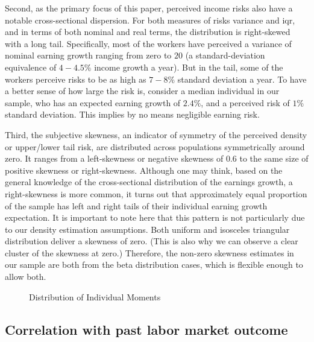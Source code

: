 \documentclass[12pt,notitlepage,onecolumn,aps,pra]{article}
\begin{document}
Second, as the primary focus of this paper, perceived income risks also
have a notable cross-sectional dispersion. For both measures of risks
variance and iqr, and in terms of both nominal and real terms, the
distribution is right-skewed with a long tail. Specifically, most of the
workers have perceived a variance of nominal earning growth ranging from
zero to \(20\) (a standard-deviation equivalence of \(4-4.5\%\) income
growth a year). But in the tail, some of the workers perceive risks to
be as high as \(7-8\%\) standard deviation a year. To have a better
sense of how large the risk is, consider a median individual in our
sample, who has an expected earning growth of \(2.4\%\), and a perceived
risk of \(1\%\) standard deviation. This implies by no means negligible
earning risk.

Third, the subjective skewness, an indicator of symmetry of the
perceived density or upper/lower tail risk, are distributed across
populations symmetrically around zero. It ranges from a left-skewness or
negative skewness of 0.6 to the same size of positive skewness or
right-skewness. Although one may think, based on the general knowledge
of the cross-sectional distribution of the earnings growth, a
right-skewness is more common, it turns out that approximately equal
proportion of the sample has left and right tails of their individual
earning growth expectation. It is important to note here that this
pattern is not particularly due to our density estimation assumptions.
Both uniform and isosceles triangular distribution deliver a skewness of
zero. (This is also why we can observe a clear cluster of the skewness
at zero.) Therefore, the non-zero skewness estimates in our sample are
both from the beta distribution cases, which is flexible enough to allow
both.


    \begin{figure}[!ht]
        \begin{center}\end{center}
        \caption{Distribution of Individual Moments}
        \label{fig:histmoms}
    \end{figure}
    
    \hypertarget{correlation-with-past-labor-market-outcome}{%
\subsection{Correlation with past labor market
outcome}\label{correlation-with-past-labor-market-outcome}}
\end{document}
